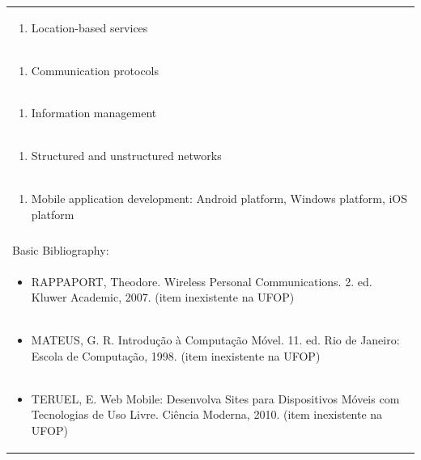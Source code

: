 \documentclass[11pt]{article}
\begin{document}
\begin{center}
\begin{longtable}{|p{4cm}|p{4cm}|p{4cm}|p{4cm}|}
\multicolumn{4}{|p{\dimexpr 16cm + 6\tabcolsep\relax}|}{\begin{enumerate}[start=3]\item Location-based services\end{enumerate}}\\
\multicolumn{4}{|p{\dimexpr 16cm + 6\tabcolsep\relax}|}{\begin{enumerate}[start=4]\item Communication protocols\end{enumerate}}\\
\multicolumn{4}{|p{\dimexpr 16cm + 6\tabcolsep\relax}|}{\begin{enumerate}[start=5]\item Information management\end{enumerate}}\\
\multicolumn{4}{|p{\dimexpr 16cm + 6\tabcolsep\relax}|}{\begin{enumerate}[start=6]\item Structured and unstructured networks\end{enumerate}}\\
\multicolumn{4}{|p{\dimexpr 16cm + 6\tabcolsep\relax}|}{\begin{enumerate}[start=7]\item Mobile application development: Android platform, Windows platform, iOS platform\end{enumerate}}\\
\multicolumn{4}{|p{\dimexpr 16cm + 6\tabcolsep\relax}|}{}\\
\hline
\multicolumn{4}{|p{16cm}|}{Basic Bibliography:}\\*
\multicolumn{4}{|p{\dimexpr 16cm + 6\tabcolsep\relax}|}{\begin{itemize}\item RAPPAPORT, Theodore. Wireless Personal Communications. 2. ed. Kluwer Academic, 2007. (item inexistente na UFOP)\end{itemize}}\\
\multicolumn{4}{|p{\dimexpr 16cm + 6\tabcolsep\relax}|}{\begin{itemize}\item MATEUS, G. R. Introdução à Computação Móvel. 11. ed. Rio de Janeiro: Escola de Computação, 1998. (item inexistente na UFOP)\end{itemize}}\\
\multicolumn{4}{|p{\dimexpr 16cm + 6\tabcolsep\relax}|}{\begin{itemize}\item TERUEL, E. Web Mobile: Desenvolva Sites para Dispositivos Móveis com Tecnologias de Uso Livre. Ciência Moderna, 2010. (item inexistente na UFOP)\end{itemize}}\\

\end{longtable}
\end{center}
\end{document}
